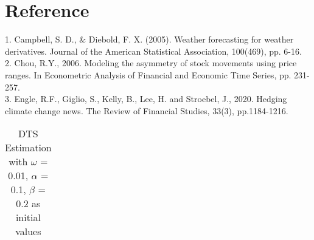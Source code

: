 \documentclass{article}
\begin{document}
	\section{Reference}	
	1. Campbell, S. D., \& Diebold, F. X. (2005). Weather forecasting for weather derivatives. Journal of the American Statistical Association, 100(469), pp. 6-16.
	~\\
	2. Chou, R.Y., 2006. Modeling the asymmetry of stock movements using price ranges. In Econometric Analysis of Financial and Economic Time Series, pp. 231-257. 
	~\\	
	3. Engle, R.F., Giglio, S., Kelly, B., Lee, H. and Stroebel, J., 2020. Hedging climate change news. The Review of Financial Studies, 33(3), pp.1184-1216.
	\begin{sidewaystable}[htbp]
		\centering
		\caption{DTS Estimation with $\omega$ = 0.01, $\alpha$ = 0.1, $\beta$ = 0.2 as initial values}
		\begin{tabular}{cccccccccccccc}
			\toprule
			

\end{tabular}
\end{sidewaystable}
\end{document}
